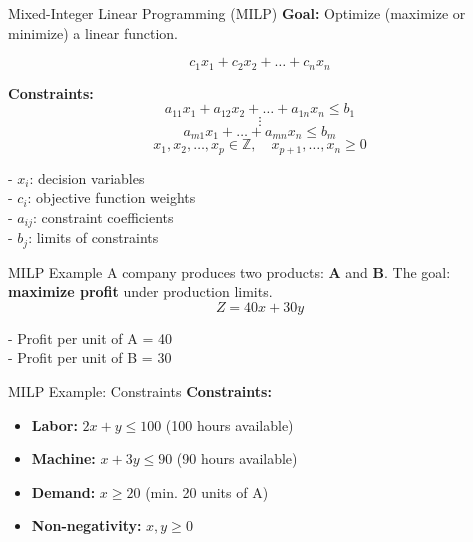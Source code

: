 \documentclass{beamer}
\begin{document}
\begin{frame}{Mixed-Integer Linear Programming (MILP)}
\textbf{Goal:} Optimize (maximize or minimize) a linear function.

\[
 c_1x_1 + c_2x_2 + \dots + c_nx_n
\]

\textbf{Constraints:}
\[
a_{11}x_1 + a_{12}x_2 + \dots + a_{1n}x_n \leq b_1
\]
\[
\vdots
\]
\[
a_{m1}x_1 + \dots + a_{mn}x_n \leq b_m
\]
\[
x_1, x_2, \dots, x_p \in \mathbb{Z}, 
\quad x_{p+1}, \dots, x_n \geq 0
\]

\bigskip
\small
- $x_i$: decision variables \\
- $c_i$: objective function weights \\
- $a_{ij}$: constraint coefficients \\
- $b_j$: limits of constraints
\end{frame}



\begin{frame}{MILP Example}
A company produces two products: \textbf{A} and \textbf{B}.  
The goal: \textbf{maximize profit} under production limits.\\


\[
Z = 40x + 30y
\]

\smallskip
- Profit per unit of A = 40 \\
- Profit per unit of B = 30
\end{frame}

\begin{frame}{MILP Example: Constraints}
\textbf{Constraints:}
\begin{itemize}
    \item \textbf{Labor: } $2x + y \leq 100$ \hfill (100 hours available)
    \item \textbf{Machine: } $x + 3y \leq 90$ \hfill (90 hours available)
    \item \textbf{Demand: } $x \geq 20$ \hfill (min. 20 units of A)
    \item \textbf{Non-negativity: } $x, y \geq 0$
\end{itemize}
\end{frame}
\end{document}
